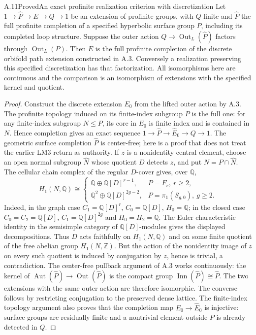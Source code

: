 \begin{statement}{A.11}{Proved}{An exact profinite realization criterion with discretization}
Let $1\to\widehat P\to E\to Q\to1$ be an extension of
profinite groups, with $Q$ finite and $\widehat P$ the full
profinite completion of a specified hyperbolic surface group
$P$, including its completed loop structure. Suppose the outer
action $Q\to\operatorname{Out}_L(\widehat P)$ factors through
$\operatorname{Out}_L(P)$. Then $E$ is the full profinite
completion of the discrete orbifold path extension constructed
in A.3. Conversely a realization preserving this specified
discretization has that factorization. All isomorphisms here
are continuous and the comparison is an isomorphism of
extensions with the specified kernel and quotient.
\end{statement}
\begin{proof}
Construct the discrete extension $E_0$ from the lifted outer
action by A.3. The profinite topology induced on its
finite-index subgroup $P$ is the full one: for any finite-index
subgroup $N\leq P$, its core in $E_0$ is finite index and is
contained in $N$. Hence completion gives an exact sequence
$1\to\widehat P\to\widehat E_0\to Q\to1$.
The geometric surface completion $\widehat P$ is center-free;
here is a proof that does not treat the earlier LM3 return as
authority. If $z$ is a nonidentity central element, choose an
open normal subgroup $\widehat N$ whose quotient $D$ detects
$z$, and put $N=P\cap\widehat N$. The cellular chain complex
of the regular $D$-cover gives, over $\mathbb Q$,
\[
 H_1(N,\mathbb Q)\cong
 \begin{cases}
  \mathbb Q\oplus\mathbb Q[D]^{r-1},& P=F_r,\ r\geq2,\\
  \mathbb Q^2\oplus\mathbb Q[D]^{2g-2},& P=\pi_1(S_{g,0}),\ g\geq2.
 \end{cases}
\]
Indeed, in the graph case $C_1=\mathbb Q[D]^r$,
$C_0=\mathbb Q[D]$, $H_0=\mathbb Q$; in the closed case
$C_0=C_2=\mathbb Q[D]$, $C_1=\mathbb Q[D]^{2g}$ and
$H_0=H_2=\mathbb Q$. The Euler characteristic identity in
the semisimple category of $\mathbb Q[D]$-modules gives the
displayed decompositions. Thus $D$ acts faithfully on
$H_1(N,\mathbb Q)$ and on some finite quotient of the free
abelian group $H_1(N,\mathbb Z)$. But the action of the
nonidentity image of $z$ on every such quotient is induced
by conjugation by $z$, hence is trivial, a contradiction.
The center-free pullback argument of A.3 works continuously:
the kernel of $\operatorname{Aut}(\widehat P)\to
\operatorname{Out}(\widehat P)$ is the compact group
$\operatorname{Inn}(\widehat P)\cong\widehat P$. The two
extensions with the same outer action are therefore isomorphic.
The converse follows by restricting conjugation to the
preserved dense lattice. The finite-index topology argument
also proves that the completion map $E_0\to\widehat E_0$
is injective: surface groups are residually finite and a
nontrivial element outside $P$ is already detected in $Q$.
\end{proof}


